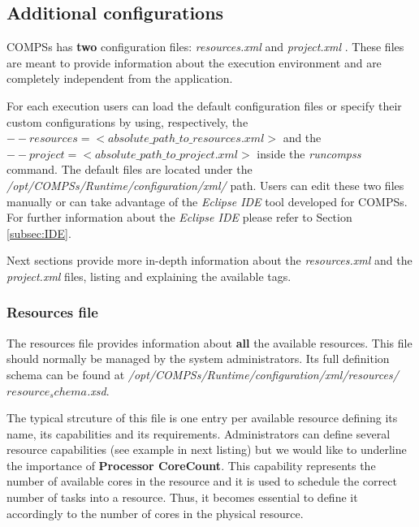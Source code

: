 \subsection{Additional configurations}

COMPSs has \textbf{two} configuration files: \textit{resources.xml} and \textit{project.xml} . 
These files are meant to provide information about the execution environment 
and are completely independent from the application.

For each execution users can load the default configuration files or specify their custom configurations 
by using, respectively, the \textit{$--resources=<absolute\_path\_to\_resources.xml>$} and the
\textit{$--project=<absolute\_path\_to\_project.xml>$} inside the \textit{runcompss} command. The default files are located 
under the \emph{/opt/COMPSs/Runtime/configuration/xml/} path. 
Users can edit these two files manually or can take advantage of the \textit{Eclipse IDE} tool developed for COMPSs. For further 
information about the \textit{Eclipse IDE} please refer to Section \ref{subsec:IDE}. 


Next sections provide more in-depth information about the \textit{resources.xml} and the \textit{project.xml} files, listing and 
explaining the available tags.

\subsubsection{Resources file}
The resources file provides information about \textbf{all} the available resources. This file should normally be 
managed by the system administrators. Its full definition schema can be found at 
\emph{/opt/COMPSs/Runtime/configuration/xml/resources/$resource_schema$.xsd}.

The typical strcuture of this file is one entry per available resource defining its name, its capabilities and its requirements.
Administrators can define several resource capabilities (see example in next listing) but we would like 
to underline the importance of \textbf{Processor CoreCount}. This capability represents the number of available cores 
in the resource and it is used to schedule the correct number of tasks into a resource. Thus, it becomes essential to define 
it accordingly to the number of cores in the physical resource. 

